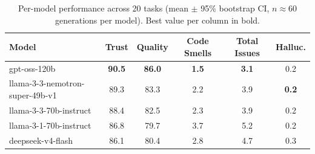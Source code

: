\begin{table}[t]
\centering
\caption{Per-model performance across 20 tasks (mean $\pm$ 95\% bootstrap CI, $n\approx60$ generations per model). Best value per column in bold.}
\label{tab:master}
\begin{tabular}{lccccc}
\toprule
Model & Trust & Quality & Code Smells & Total Issues & Halluc. \\
\midrule
gpt-oss-120b & \textbf{90.5} & \textbf{86.0} & \textbf{1.5} & \textbf{3.1} & 0.2 \\
llama-3-3-nemotron-super-49b-v1 & 89.3 & 83.3 & 2.2 & 3.9 & \textbf{0.2} \\
llama-3-3-70b-instruct & 88.4 & 82.5 & 2.3 & 3.9 & 0.2 \\
llama-3-1-70b-instruct & 86.8 & 79.7 & 3.7 & 5.2 & 0.2 \\
deepseek-v4-flash & 86.1 & 80.4 & 2.8 & 4.7 & 0.3 \\
\bottomrule
\end{tabular}
\end{table}